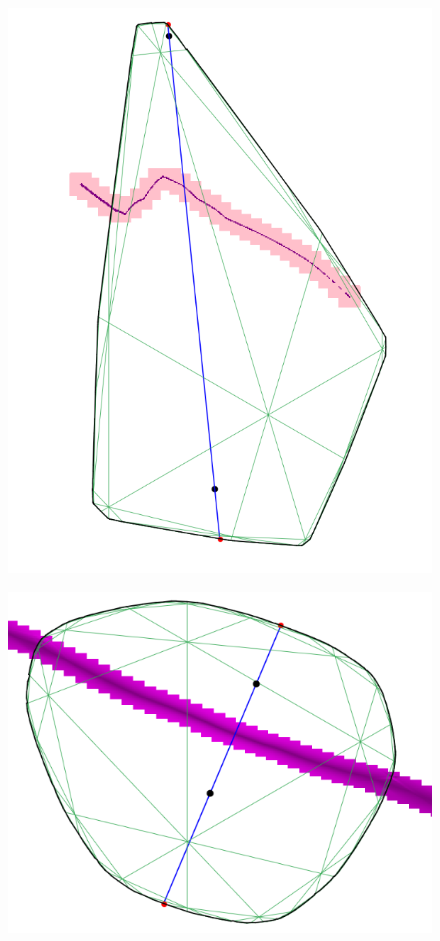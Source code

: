 \documentclass[12pt]{article}%
\begin{document}
\begin{enumerate}
\begin{figure}[H]
			\includegraphics[scale=0.25]{extreme_deformation2.png}
		\end{figure}
		\begin{figure}[H]
			\centering
			\includegraphics[scale=0.3]{gradient_bisector.png}

\end{figure}
\end{enumerate}
\end{document}
